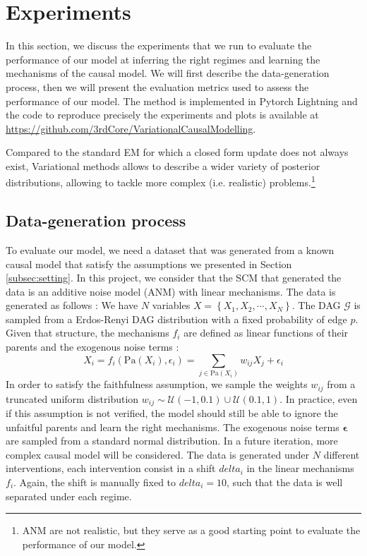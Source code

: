 \documentclass{article}
\begin{document}
\section{Experiments}\label{subsec:Experiments}
In this section, we discuss the experiments that we run to evaluate the
performance of our model at inferring the right regimes and learning the
mechanisms of the causal model. We will first describe the data-generation
process, then we will present the evaluation metrics used to assess the
performance of our model. The method is implemented in Pytorch Lightning and
the code to reproduce precisely the experiments and plots is available at
\url{https://github.com/3rdCore/VariationalCausalModelling}.

Compared to the standard EM for which a closed form update does not always
exist, Variational methods allows to describe a wider variety of posterior
distributions, allowing to tackle more complex (i.e. realistic)
problems.\footnote{ANM are not realistic, but they serve as a good starting
    point to evaluate the performance of our model.}

\subsection{Data-generation process}

To evaluate our model, we need a dataset that was generated from a known causal
model that satisfy the assumptions we presented in Section
\ref{subsec:setting}. In this project, we consider that the SCM that generated
the data is an additive noise model (ANM) with linear mechanisms. The data is
generated as follows : We have $N$ variables $X = \left\{ X_1, X_2, \cdots, X_N
    \right\}$. The DAG $\mathcal{G}$ is sampled from a Erdos-Renyi DAG distribution
with a fixed probability of edge $p$. Given that structure, the mechanisms
$f_i$ are defined as linear functions of their parents and the exogenous noise
terms :
\begin{equation}
    X_i = f_i(\text{Pa}(X_i), \epsilon_i) =
    \sum_{j \in \text{Pa}(X_i)} w_{ij} X_j + \epsilon_i
\end{equation}
In order to satisfy the faithfulness assumption, we sample the weights $w_{ij}$ from a truncated uniform distribution $w_{ij} \sim \mathcal{U}(-1,0.1) \cup \mathcal{U}(0.1,1)$. In practice, even if this assumption is not verified, the model should still be able to ignore the unfaitful parents and learn the right mechanisms. The exogenous noise terms $\boldsymbol{\epsilon}$ are sampled from a standard normal distribution. In a future iteration, more complex causal model will be considered. The data is generated under $N$ different interventions, each intervention consist in a shift $delta_i$ in the linear mechanisms $f_i$. Again, the shift is manually fixed to $delta_i = 10$, such that the data is well separated under each regime.
\end{document}
